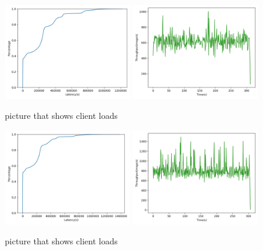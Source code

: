 \begin{figure}[!htb]
  \centering
  \includegraphics[width=0.49\textwidth,height=\textheight,keepaspectratio]{img/constant10_lat.png}
  \includegraphics[width=0.49\textwidth,height=\textheight,keepaspectratio]{img/constant10_tp.png}
  \caption[caption]{ picture that shows client loads }
  \label{fig:constant10-performance}
\end{figure}

\begin{figure}[!htb]
  \centering
  \includegraphics[width=0.49\textwidth,height=\textheight,keepaspectratio]{img/constant5_lat.png}
  \includegraphics[width=0.49\textwidth,height=\textheight,keepaspectratio]{img/constant5_tp.png}
  \caption[caption]{ picture that shows client loads }
  \label{fig:constant5-performance}
\end{figure}

